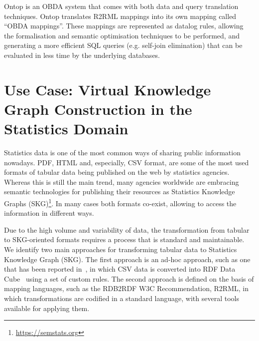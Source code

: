 Ontop \citep{rodriguez2015efficient} is an OBDA system that comes with both data and query translation techniques. Ontop translates R2RML mappings into its own mapping called ``OBDA mappings''. These mappings are represented as datalog rules, allowing the formalisation and semantic optimisation techniques to be performed, and generating a more efficient SQL queries (e.g. self-join elimination) that can be evaluated in less time by the underlying databases.


\section{Use Case: Virtual Knowledge Graph Construction in the Statistics Domain}
\label{sec:chap4_rmlc}

Statistics data is one of the most common ways of sharing public information nowadays. PDF, HTML and, especially, CSV format, are some of the most used formats of tabular data being published on the web by statistics agencies. Whereas this is still the main trend, many agencies worldwide are embracing semantic technologies for publishing their resources as Statistics Knowledge Graphs (SKG)\footnote{\url{https://semstats.org}}. In many cases both formats co-exist, allowing to access the information in different ways. 

Due to the high volume and variability of data, the transformation from tabular to SKG-oriented formats requires a process that is standard and maintainable. We identify two main approaches for transforming tabular data to Statistics Knowledge Graph (SKG). The first approach is an ad-hoc approach, such as one that has been reported in~\citep{corcho2017publishing}, in which CSV data is converted into RDF Data Cube~\citep{cyganiak2012rdf} using a set of custom rules. The second approach is defined on the basis of mapping languages, such as the RDB2RDF W3C Recommendation, R2RML, in which transformations are codified in a standard language, with several tools available for applying them.

